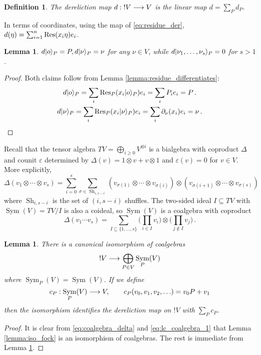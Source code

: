 \documentclass[english,letter paper,12pt,reqno]{article}
\DeclarePairedDelimiter\ket{\lvert}{\rangle}
\newtheorem{lemma}[theorem]{Lemma}
\theoremstyle{example}
\newtheorem{definition}[theorem]{Definition}
\numberwithin{equation}{section}
\DeclareMathOperator{\Sym}{Sym}
\begin{document}
\begin{definition} The \emph{dereliction} map $d: {!}V \longrightarrow V$ is the linear map $d = \sum_P d_P$.
\end{definition}

In terms of coordinates, using the map of \eqref{eq:residue_der}, $d( \eta ) = \sum_{i=1}^n \operatorname{Res}\!\,( x_i \eta ) e_i$.

\begin{lemma}\label{lemma:dereliction_describe} $d \ket{o}_P = P, d \ket{\nu}_P = \nu$ for any $\nu \in V$, while $d \ket{\nu_1,\ldots,\nu_s}_P = 0$ for $s > 1$.
\end{lemma}
\begin{proof}
Both claims follow from Lemma \ref{lemma:residue_differentiates}:
\begin{gather*}
d \ket{o}_P = \sum_i \Res_P( x_i \ket{o}_P ) e_i = \sum_i P_i e_i = P\,.\\
d \ket{\nu}_P = \sum_i \Res_P( x_i \ket{\nu}_P ) e_i = \sum_i \partial_\nu( x_i ) e_i = \nu\,.
\end{gather*}
\end{proof}

Recall that the tensor algebra $TV = \bigoplus_{i \ge 0} V^{\otimes i}$ is a bialgebra with coproduct $\Delta$ and counit $\varepsilon$ determined by $\Delta(v) = 1 \otimes v + v \otimes 1$ and $\varepsilon(v) = 0$ for $v \in V$. More explicitly,
\begin{equation}
\Delta(v_1 \otimes \cdots \otimes v_s) = \sum_{i=0}^s \sum_{\sigma \in \operatorname{Sh}_{i,s-i}} ( v_{\sigma(1)} \otimes \cdots \otimes v_{\sigma(i)} ) \otimes ( v_{\sigma(i+1)} \otimes \cdots \otimes v_{\sigma(s)} )
\end{equation}
where $\operatorname{Sh}_{i,s-i}$ is the set of $(i,s-i)$ shuffles. The two-sided ideal $I \subseteq TV$ with $\Sym(V) = TV/I$ is also a coideal, so $\Sym(V)$ is a coalgebra with coproduct
\begin{equation}\label{eq:coalgebra_delta}
\Delta( v_1 \cdots v_s ) = \sum_{I \subseteq \{1,\ldots,s\}} \Big(\prod_{i \in I} v_i\Big) \otimes \Big(\prod_{j \notin I} v_j\Big)\,.
\end{equation}

\begin{lemma}\label{lemma:relate_to_fock} There is a canonical isomorphism of coalgebras
\begin{equation}
{!} V \lto \bigoplus_{P \in V} \Sym_P(V)
\end{equation}
where $\Sym_P(V) = \Sym(V)$. If we define
\[
c_P: \Sym_P(V) \lto V, \qquad c_P( v_0, v_1, v_2, \ldots ) = v_0 P + v_1
\]
then the isomorphism identifies the dereliction map on ${!} V$ with $\sum_P c_P$.
\end{lemma}
\begin{proof}
It is clear from \eqref{eq:coalgebra_delta} and \eqref{eq:lc_coalgebra_1} that Lemma \ref{lemma:iso_fock} is an isomorphism of coalgebras. The rest is immediate from Lemma \ref{lemma:dereliction_describe}.
\end{proof}
\end{document}
